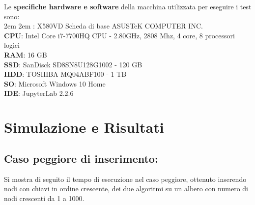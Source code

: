 \documentclass[]{article}
\begin{document}
Le {\bf specifiche hardware e software} della macchina utilizzata per eseguire i test sono:\\

\begingroup
\leftskip2em \rightskip2em
: X580VD Scheda di base ASUSTeK COMPUTER INC.\\
{\bf CPU}:  Intel Core i7-7700HQ CPU - 2.80GHz, 2808 Mhz, 4 core, 8 processori logici\\
{\bf RAM}: 16 GB\\
{\bf SSD}: SanDisck SD8SN8U128G1002 - 120 GB\\
{\bf HDD}: TOSHIBA MQ04ABF100 - 1 TB\\
{\bf SO}: Microsoft Windows 10 Home \\
{\bf IDE}: JupyterLab 2.2.6 \\
\vspace{-5mm}

\section{Simulazione e Risultati}

\subsection {Caso peggiore di inserimento:} 
Si mostra di seguito il tempo di esecuzione nel caso peggiore, ottenuto inserendo nodi con chiavi in ordine crescente,  dei due algoritmi su un albero con numero di nodi crescenti da 1 a 1000. \\
\end{document}
